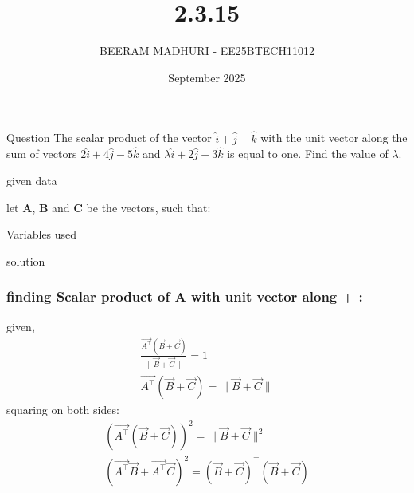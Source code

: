 \documentclass{beamer}
\title %
{2.3.15}
\date{September  2025}
\author %
{BEERAM MADHURI - EE25BTECH11012}
\begin{document}
\frame{\titlepage}
\begin{frame}{Question}
The scalar product of the vector $\hat{i}+\hat{j}+\hat{k}$ with the unit vector along the sum of vectors $2\hat{i} + 4\hat{j} - 5\hat{k}$ and $\lambda \hat{i} + 2\hat{j} + 3\hat{k}$ is equal to one. Find the value of $\lambda$.
 
\end{frame}
 
\begin{frame}{given data}
 
\text let $\mathbf{A}$, $\mathbf{B}$ and $\mathbf{C}$ be the vectors, such that:
\begin{table}[h!]
    \centering
    
    \caption{Variables used}
    \label{table 2.3.15}
\end{table}
\end{frame}
 
\begin{frame}{solution}
\frametitle{finding Scalar product of $\mathbf{A}$ with unit vector along + :}
\text given,
\begin{align}
 \frac{\vec{A^\top} (\vec{B}+\vec{C})}{\|\vec{B}+\vec{C}\|} = 1\\
\vec{A^\top} (\vec{B}+\vec{C}) = \|\vec{B}+\vec{C}\|
\end{align}
\text squaring on both sides:
\begin{align}
(\vec{A^\top} (\vec{B}+\vec{C}))^2 = \|\vec{B}+\vec{C}\|^2\\
(\vec{A^\top} \vec{B} + \vec{A^\top} \vec{C})^2 = (\vec{B}+\vec{C})^\top(\vec{B}+\vec{C})
\end{align}
\end{frame}
\end{document}
